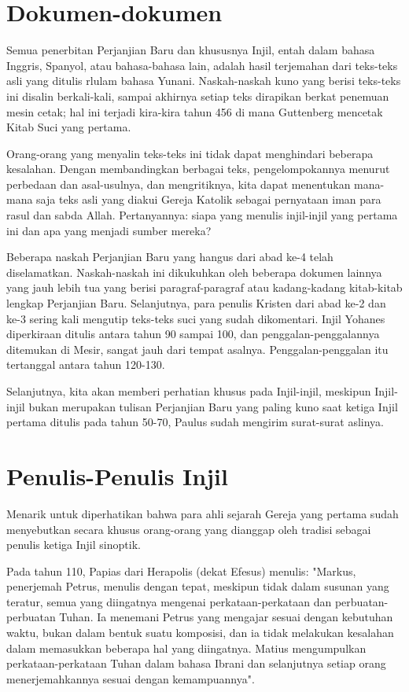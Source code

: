 
\section*{Dokumen-dokumen}
Semua penerbitan Perjanjian Baru dan khususnya Injil, entah dalam bahasa Inggris, Spanyol, atau bahasa-bahasa lain, adalah hasil terjemahan dari teks-teks asli yang ditulis rlulam bahasa Yunani. Naskah-naskah kuno yang berisi teks-teks ini disalin berkali-kali, sampai akhirnya setiap teks dirapikan berkat penemuan mesin cetak; hal ini terjadi kira-kira tahun 456 di mana Guttenberg mencetak Kitab Suci yang pertama.

Orang-orang yang menyalin teks-teks ini tidak dapat menghindari beberapa kesalahan. Dengan membandingkan berbagai teks, pengelompokannya menurut perbedaan dan asal-usulnya, dan mengritiknya, kita dapat menentukan mana-mana saja teks asli yang diakui Gereja Katolik sebagai pernyataan iman para rasul dan sabda Allah. Pertanyannya: siapa yang menulis injil-injil yang pertama ini dan apa yang menjadi sumber mereka?

Beberapa naskah Perjanjian Baru yang hangus dari abad ke-4 telah diselamatkan. Naskah-naskah ini dikukuhkan oleh beberapa dokumen lainnya yang jauh lebih tua yang berisi paragraf-paragraf atau kadang-kadang kitab-kitab lengkap Perjanjian Baru. Selanjutnya, para penulis Kristen dari abad ke-2 dan ke-3 sering kali mengutip teks-teks suci yang sudah dikomentari. Injil Yohanes diperkiraan ditulis antara tahun 90 sampai 100, dan penggalan-penggalannya ditemukan di Mesir, sangat jauh dari tempat asalnya. Penggalan-penggalan itu tertanggal antara tahun 120-130.

Selanjutnya, kita akan memberi perhatian khusus pada Injil-injil, meskipun Injil-injil bukan merupakan tulisan Perjanjian Baru yang paling kuno saat ketiga Injil pertama ditulis pada tahun 50-70, Paulus sudah mengirim surat-surat aslinya.

\section*{Penulis-Penulis Injil}
Menarik untuk diperhatikan bahwa para ahli sejarah Gereja yang pertama sudah menyebutkan secara khusus orang-orang yang dianggap oleh tradisi sebagai penulis ketiga Injil sinoptik.

Pada tahun 110, Papias dari Herapolis (dekat Efesus) menulis: "Markus, penerjemah Petrus, menulis dengan tepat, meskipun tidak dalam susunan yang teratur, semua yang diingatnya mengenai perkataan-perkataan dan perbuatan-perbuatan Tuhan. Ia menemani Petrus yang mengajar sesuai dengan kebutuhan waktu, bukan dalam bentuk suatu komposisi, dan ia tidak melakukan kesalahan dalam memasukkan beberapa hal yang diingatnya. Matius mengumpulkan perkataan-perkataan Tuhan dalam bahasa Ibrani dan selanjutnya setiap orang menerjemahkannya sesuai dengan kemampuannya".

